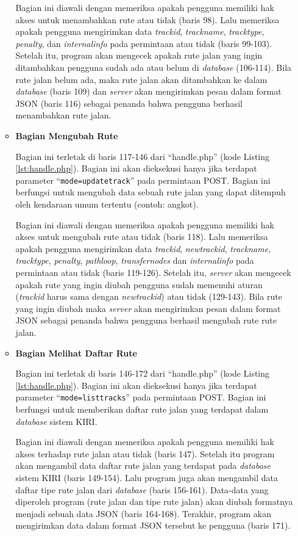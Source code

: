 \documentclass[a4paper,twoside]{article}
\begin{document}
\begin{enumerate}
\begin{itemize}
Bagian ini diawali dengan memeriksa apakah pengguna memiliki hak akses untuk menambahkan rute atau tidak (baris 98). Lalu memeriksa apakah pengguna mengirimkan data \textit{trackid}, \textit{trackname}, \textit{tracktype}, \textit{penalty}, dan \textit{internalinfo} pada permintaan atau tidak (baris 99-103). Setelah itu, program akan mengecek apakah rute jalan yang ingin ditambahkan pengguna sudah ada atau belum di \textit{database} (106-114). Bila rute jalan belum ada, maka rute jalan akan ditambahkan ke dalam \textit{database} (baris 109) dan \textit{server} akan mengirimkan pesan dalam format JSON (baris 116) sebagai penanda bahwa pengguna berhasil menambahkan rute jalan.

\item \textbf{Bagian Mengubah Rute}

Bagian ini terletak di baris 117-146 dari ``handle.php'' (kode Listing \ref{lst:handle.php}). Bagian ini akan dieksekusi hanya jika terdapat parameter ``\texttt{mode=updatetrack}'' pada permintaan POST. Bagian ini berfungsi untuk mengubah data sebuah rute jalan yang dapat ditempuh oleh kendaraan umum tertentu (contoh: angkot).

Bagian ini diawali dengan memeriksa apakah pengguna memiliki hak akses untuk mengubah rute atau tidak (baris 118). Lalu memeriksa apakah pengguna mengirimkan data \textit{trackid}, \textit{newtrackid}, \textit{trackname}, \textit{tracktype}, \textit{penalty}, \textit{pathloop}, \textit{transfernodes}  dan \textit{internalinfo} pada permintaan atau tidak (baris 119-126). Setelah itu, \textit{server} akan mengecek apakah rute yang ingin diubah pengguna sudah memenuhi aturan (\textit{trackid} harus sama dengan \textit{newtrackid}) atau tidak (129-143). Bila rute yang ingin diubah maka \textit{server} akan mengirimkan pesan dalam format JSON sebagai penanda bahwa pengguna berhasil mengubah rute rute jalan.

\item \textbf{Bagian Melihat Daftar Rute}

Bagian ini terletak di baris 146-172 dari ``handle.php'' (kode Listing \ref{lst:handle.php}). Bagian ini akan dieksekusi hanya jika terdapat parameter ``\texttt{mode=listtracks}'' pada permintaan POST. Bagian ini berfungsi untuk memberikan daftar rute jalan yang terdapat dalam \textit{database} sistem KIRI.

Bagian ini diawali dengan memeriksa apakah pengguna memiliki hak akses terhadap rute jalan atau tidak (baris 147). Setelah itu program akan mengambil data daftar rute jalan yang terdapat pada \textit{database} sistem KIRI (baris 149-154). Lalu program juga akan mengambil data daftar tipe rute jalan dari \textit{database} (baris 156-161). Data-data yang diperoleh program (rute jalan dan tipe rute jalan) akan diubah formatnya menjadi sebuah data JSON (baris 164-168). Terakhir, program akan mengirimkan data dalam format JSON tersebut ke pengguna (baris 171).


\end{itemize}
\end{enumerate}
\end{document}
